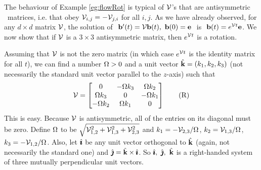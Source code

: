 \begin{eg}\label{eg:flowRotB}
The behaviour of Example \ref{eg:flowRot} is typical of $\mathcal{V}$'s that 
are antisymmetric%
\ matrices, i.e. that obey $\mathcal{V}_{i,j}=-\mathcal{V}_{j,i}$ 
for all $i,j$. As we have already observed, for any $d\times d$ 
matrix  $\mathcal{V}$, the solution of 
$\ 
\vb'(t)=\cV\vb(t),\  \vb(0)=\ve
\ $
is
$\ 
\vb(t)=e^{\cV t}\ve
$.
We now show that if $\mathcal{V}$ is a $3\times 3$ antisymmetric matrix,
then $e^{\mathcal{V} t}$ is a rotation. 

Assuming that $\mathcal{V}$ is not the zero 
matrix (in which case $e^{\mathcal{V} t}$ is the identity matrix for all $t$), 
we can find a number $\Omega>0$ and a unit vector $\hat{\mathbf{k}}=(k_1,k_2,k_3)$ 
(not necessarily the standard unit vector parallel to the $z$-axis) 
such that
\begin{equation}
\mathcal{V}=\left[\begin{matrix}0 & -\Omega k_3 & \Omega k_2\cr
                \Omega k_3& 0 & -\Omega k_1\cr
                -\Omega k_2&  \Omega k_1&0\end{matrix}\right]
\tag{R}\end{equation}
This is easy. Because $\mathcal{V}$ is antisymmetric, all of the entries on 
its diagonal must be zero. Define $\Omega$ to be 
$\sqrt{\mathcal{V}_{1,2}^2+\mathcal{V}_{1,3}^2+\mathcal{V}_{2,3}^2}$
and $k_1=-\mathcal{V}_{2,3}/\Omega$, $k_2=\mathcal{V}_{1,3}/\Omega$, $k_3=-\mathcal{V}_{1,2}/\Omega$. Also,
let $\hat{\pmb{\imath}}$ be any unit vector orthogonal to $\hat{\mathbf{k}}$ (again, not necessarily
the standard one) and $\hat{\pmb{\jmath}}=\hat{\mathbf{k}}\times\hat{\pmb{\imath}}$. So $\hat{\pmb{\imath}},\ \hat{\pmb{\jmath}},\ \hat{\mathbf{k}}$ is a 
right-handed system of three mutually perpendicular unit vectors.


\end{eg}
